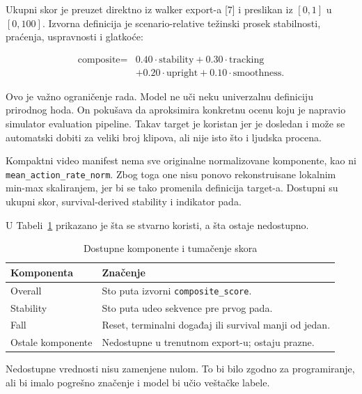 ﻿\documentclass[12pt,a4paper]{report}
\begin{document}
Ukupni skor je preuzet direktno iz walker export-a [7] i preslikan iz $[0,1]$
u $[0,100]$. Izvorna definicija je scenario-relative težinski prosek
stabilnosti, praćenja, uspravnosti i glatkoće:

\begin{equation*}
\begin{aligned}
\text{composite} = {} & 0.40 \cdot \text{stability}
+ 0.30 \cdot \text{tracking} \\
& + 0.20 \cdot \text{upright}
+ 0.10 \cdot \text{smoothness}.
\end{aligned}
\end{equation*}

Ovo je važno ograničenje rada. Model ne uči neku univerzalnu definiciju
prirodnog hoda. On pokušava da aproksimira konkretnu ocenu koju je napravio
simulator evaluation pipeline. Takav target je koristan jer je dosledan i
može se automatski dobiti za veliki broj klipova, ali nije isto što i ljudska
procena.

Kompaktni video manifest nema sve originalne normalizovane komponente, kao ni
\texttt{mean\_action\_rate\_norm}. Zbog toga one nisu ponovo rekonstruisane
lokalnim min-max skaliranjem, jer bi se tako promenila definicija target-a.
Dostupni su ukupni skor, survival-derived stability i indikator pada.

U Tabeli~\ref{tab:score-components} prikazano je šta se stvarno koristi, a šta
ostaje nedostupno.

\begin{table}[H]
  \centering
  \caption{Dostupne komponente i tumačenje skora}
  \label{tab:score-components}
  \begin{tabular}{p{4.2cm}p{8.7cm}}
    \toprule
    Komponenta & Značenje \\
    \midrule
    Overall & Sto puta izvorni \texttt{composite\_score}. \\
    Stability & Sto puta udeo sekvence pre prvog pada. \\
    Fall & Reset, terminalni događaj ili survival manji od jedan. \\
    Ostale komponente & Nedostupne u trenutnom export-u; ostaju prazne. \\
    \bottomrule
  \end{tabular}
\end{table}

Nedostupne vrednosti nisu zamenjene nulom. To bi bilo zgodno za programiranje,
ali bi imalo pogrešno značenje i model bi učio veštačke labele.
\end{document}
